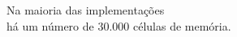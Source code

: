\documentclass[preview]{standalone}
\begin{document}
Na maioria das implementações\\há um número de 30.000 células de memória.\\
\end{document}
